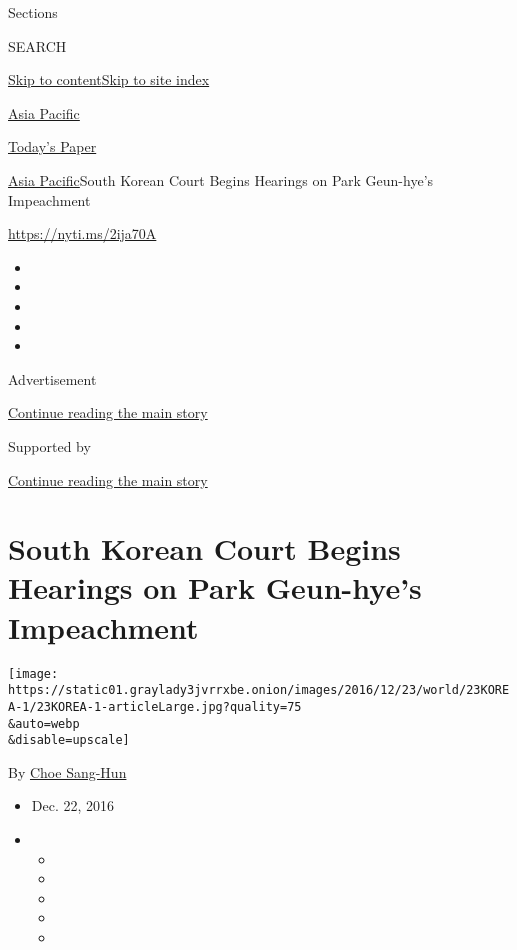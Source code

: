 Sections

SEARCH

\protect\hyperlink{site-content}{Skip to
content}\protect\hyperlink{site-index}{Skip to site index}

\href{https://www.nytimes3xbfgragh.onion/section/world/asia}{Asia
Pacific}

\href{https://myaccount.nytimes3xbfgragh.onion/auth/login?response_type=cookie\&client_id=vi}{}

\href{https://www.nytimes3xbfgragh.onion/section/todayspaper}{Today's
Paper}

\href{/section/world/asia}{Asia Pacific}\textbar{}South Korean Court
Begins Hearings on Park Geun-hye's Impeachment

\url{https://nyti.ms/2ija70A}

\begin{itemize}
\item
\item
\item
\item
\item
\end{itemize}

Advertisement

\protect\hyperlink{after-top}{Continue reading the main story}

Supported by

\protect\hyperlink{after-sponsor}{Continue reading the main story}

\hypertarget{south-korean-court-begins-hearings-on-park-geun-hyes-impeachment}{%
\section{South Korean Court Begins Hearings on Park Geun-hye's
Impeachment}\label{south-korean-court-begins-hearings-on-park-geun-hyes-impeachment}}

\texttt{[image: https://static01.graylady3jvrrxbe.onion/images/2016/12/23/world/23KOREA-1/23KOREA-1-articleLarge.jpg?quality=75\\\&auto=webp\\\&disable=upscale]}

By \href{http://www.nytimes3xbfgragh.onion/by/choe-sang-hun}{Choe
Sang-Hun}

\begin{itemize}
\item
  Dec. 22, 2016
\item
  \begin{itemize}
  \item
  \item
  \item
  \item
  \item
  \end{itemize}
\end{itemize}


